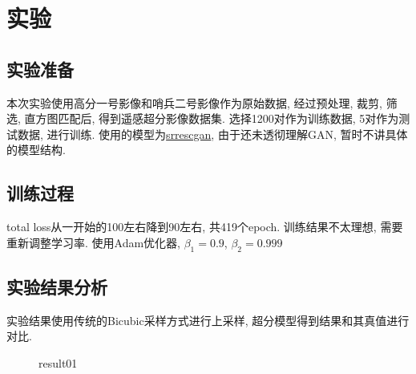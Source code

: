 \section{实验}

\subsection{实验准备}
本次实验使用高分一号影像和哨兵二号影像作为原始数据, 经过预处理, 裁剪, 筛选, 直方图匹配后, 得到遥感超分影像数据集. 选择1200对作为训练数据, 5对作为测试数据, 进行训练. 使用的模型为\href{https://github.com/RaoUmer/SRResCGAN}{srrescgan}, 由于还未透彻理解GAN, 暂时不讲具体的模型结构. 

\subsection{训练过程}
total loss从一开始的100左右降到90左右, 共419个epoch. 训练结果不太理想, 需要重新调整学习率. 使用Adam优化器, $\beta_{1}=0.9$, $\beta_2={0.999}$

\subsection{实验结果分析}
实验结果使用传统的Bicubic采样方式进行上采样, 超分模型得到结果和其真值进行对比. 

\begin{figure}[!htbp]
    \centering
    \quad
    \quad
    \caption{result01}
    \label{fig:0101}
\end{figure}

